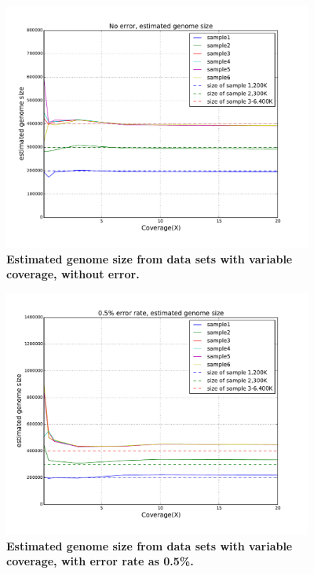 \begin{figure}[!ht]
 \centerline{\includegraphics[width=4in]{./figures/alpha_by_coverage_0e.pdf}}
\caption{\bf Estimated genome size from data sets with variable coverage,
without error.}
\label{fig:alpha_by_coverage_0e}
\end{figure}

\begin{figure}[!ht]
 \centerline{\includegraphics[width=4in]{./figures/alpha_by_coverage_0005e.pdf}}
\caption{\bf Estimated genome size from data sets with variable coverage, with
error rate as 0.5\%.}
\label{fig:alpha_by_coverage_0005e}
\end{figure}


